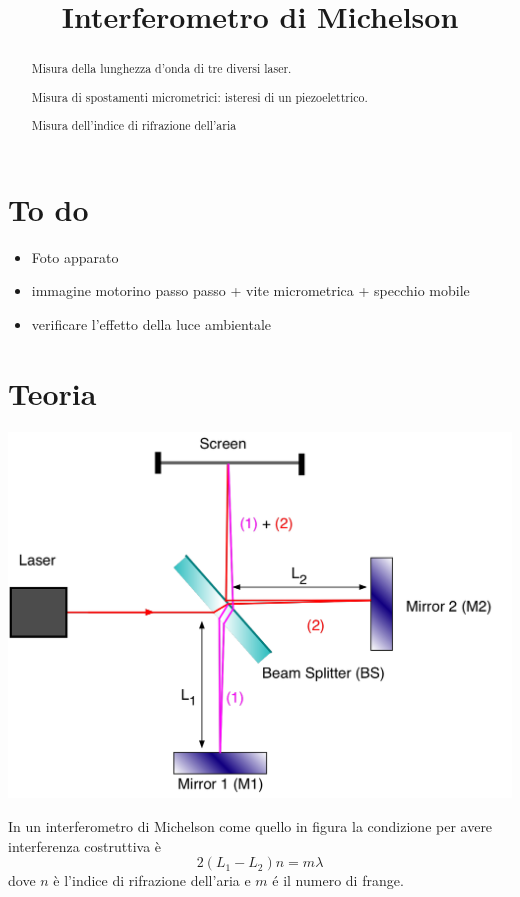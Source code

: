 \documentclass[a4paper]{article}
\begin{document}
	\title{Interferometro di Michelson}
	\maketitle
	
	\section*{To do}
	\begin{itemize}
		\item Foto apparato
		\item immagine motorino passo passo + vite micrometrica + specchio mobile
		\item verificare l'effetto della luce ambientale
	\end{itemize}
	
	
	\begin{abstract}
		 Misura della lunghezza d'onda di tre diversi laser.
		 
		 Misura di spostamenti micrometrici: isteresi di un piezoelettrico.
		 
		 Misura dell'indice di rifrazione dell'aria
	\end{abstract}

\section{Teoria}
\begin{center}
	\begin{minipage}[c]{.50\textwidth}
		\centering
		\includegraphics[width=1\textwidth]{teoria_michelson.png}
	\end{minipage}
	\begin{minipage}[c]{.40\textwidth}
		In un interferometro di Michelson come quello in figura la condizione per avere interferenza costruttiva è \[2(L_1 -L_2)n = m \lambda\] dove $n$ è l'indice di rifrazione dell'aria e $m$ é il numero di frange.
	\end{minipage}
\end{center}
\end{document}
